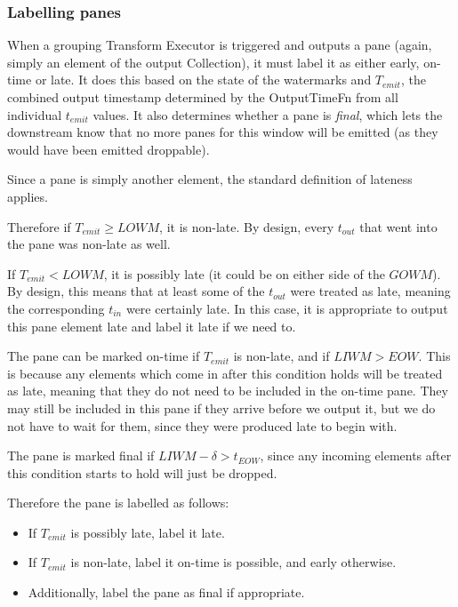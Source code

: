 \subsubsection{Labelling panes}



When a grouping Transform Executor is triggered and outputs a pane (again, simply an element of the output Collection), it must label it as either early, on-time or late.
It does this based on the state of the watermarks and $T_{\mathit{emit}}$, the combined output timestamp determined by the OutputTimeFn from all individual $t_{\mathit{emit}}$ values.
It also determines whether a pane is \emph{final}, which lets the downstream know that no more panes for this window will be emitted (as they would have been emitted droppable).

Since a pane is simply another element, the standard definition of lateness applies.

Therefore if $T_{\mathit{emit}} \geq \mathit{LOWM}$, it is non-late.
By design, every $t_{\mathit{out}}$ that went into the pane was non-late as well.

If $T_{\mathit{emit}} < \mathit{LOWM}$, it is possibly late (it could be on either side of the $\mathit{GOWM}$).
By design, this means that at least some of the $t_{\mathit{out}}$ were treated as late, meaning the corresponding $t_{\mathit{in}}$ were certainly late.
In this case, it is appropriate to output this pane element late and label it late if we need to.

The pane can be marked on-time if $T_{\mathit{emit}}$ is non-late, and if $\mathit{LIWM} > EOW$.
This is because any elements which come in after this condition holds will be treated as late, meaning that they do not need to be included in the on-time pane.
They may still be included in this pane if they arrive before we output it, but we do not have to wait for them, since they were produced late to begin with.

The pane is marked final if $\mathit{LIWM} - \delta > t_{\mathit{EOW}}$, since any incoming elements after this condition starts to hold will just be dropped.

Therefore the pane is labelled as follows:
\begin{itemize}
	\item If $T_{\mathit{emit}}$ is possibly late, label it late.
	\item If $T_{\mathit{emit}}$ is non-late, label it on-time is possible, and early otherwise.\footnotemark
	\item Additionally, label the pane as final if appropriate.
\end{itemize}

